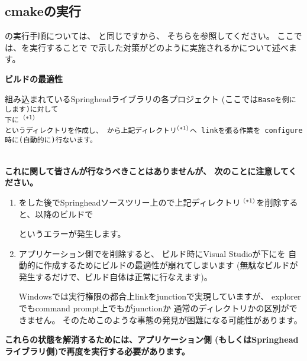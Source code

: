 \subsection{cmakeの実行}
\label{subsec:CmakeApplication}

\noindent
\cmake の実行手順については、
と同じですから、
そちらを参照してください。
ここでは、\cmake を実行することで
で示した対策がどのように実施されるかについて述べます。

\bigskip
\noindent
\bf{ビルドの最適性}
\begin{narrow}[20pt]
	組み込まれているSpringheadライブラリの各プロジェクト
	(ここでは\tt{Base}を例にします)に対して\\
	\hspace{20pt}下に
	$^{\small (*1)}$\\
	というディレクトリを作成し、
	から上記ディレクトリ$^{\small (*1)}$へ
	linkを張る作業を\cmake\ configure時に(自動的に)行ないます。
\end{narrow}	
\begin{narrow}[20pt]
	\thinrule{\linewidth}\\
	{\bf{これに関して皆さんが行なうべきことはありませんが、
	次のことに注意してください。}}

	\medskip
	\begin{enumerate}
	  \item	\cmake をした後でSpringheadソースツリー上ので上記ディレクトリ
		$^{\small (*1)}$を削除すると、以降のビルドで\\
		\hspace{15pt}

		というエラーが発生します。

	  \item	アプリケーション側でを削除すると、
		ビルド時にVisual Studioが\build 下にを
		自動的に作成するためにビルドの最適性が崩れてしまいます
		(無駄なビルドが発生するだけで、ビルド自体は正常に行なえます)。
		\begin{narrow}[s][15pt]
		Windowsでは実行権限の都合上linkをjunctionで実現していますが、
		explorerでもcommand prompt上でもがjunctionか
		通常のディレクトリかの区別ができません。
		そのためこのような事態の発見が困難になる可能性があります。
		\end{narrow}
	\end{enumerate}
	\medskip
	{\bf{これらの状態を解消するためには、アプリケーション側
	(もしくはSpringheadライブラリ側)で再度\cmake を実行する必要があります。}}

	\thinrule{\linewidth}
\end{narrow}

